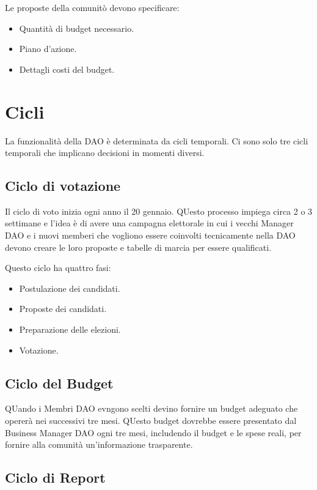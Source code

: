 \documentclass{article}
\begin{document}
Le proposte della comunitò devono specificare:

\begin{itemize}
  \item Quantità di budget necessario.
  \item Piano d'azione.
  \item Dettagli costi del budget.
\end{itemize}

\section{Cicli}

La funzionalità della DAO è determinata da cicli temporali. Ci sono solo tre cicli temporali che implicano decisioni in momenti diversi.

\subsection{Ciclo di votazione}

Il ciclo di voto inizia  ogni anno il 20 gennaio. QUesto processo impiega circa 2 o 3 settimane e l'idea è di avere una campagna elettorale in cui i vecchi Manager DAO e i nuovi memberi che vogliono essere coinvolti tecnicamente nella DAO devono creare le loro proposte e tabelle di marcia per essere qualificati.

Questo ciclo ha quattro fasi:

\begin{itemize}
  \item Postulazione dei candidati.
  \item Proposte dei candidati.
  \item Preparazione delle elezioni.
  \item Votazione.
\end{itemize}

\subsection{Ciclo del Budget}

QUando i Membri DAO evngono scelti devino fornire un budget adeguato che opererà nei successivi tre mesi. QUesto budget dovrebbe essere presentato dal Business Manager DAO ogni tre mesi, includendo il budget e le spese reali, per fornire alla comunità un'informazione trasparente.

\subsection{Ciclo di Report}
\end{document}
